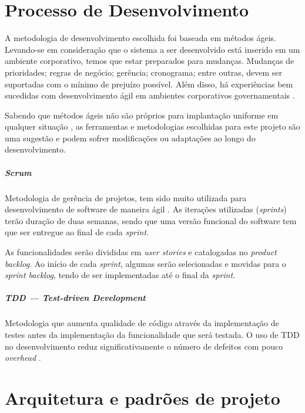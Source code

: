 \documentclass[12pt,a4paper]{report}
\begin{document}
\chapter{Processo de Desenvolvimento}

A metodologia de desenvolvimento escolhida foi baseada em métodos ágeis. Levando-se em consideração que o sistema a ser desenvolvido está inserido em um ambiente corporativo, temos que estar preparados para mudanças. Mudanças de prioridades; regras de negócio; gerência; cronograma; entre outras, devem ser suportadas com o mínimo de prejuízo possível. Além disso, há experiências bem sucedidas com desenvolvimento ágil em ambientes corporativos governamentais \cite{metaginstpub}.

Sabendo que métodos ágeis não são próprios para implantação uniforme em qualquer situação \cite{cohn2009succeeding}, as ferramentas e metodologias escolhidas para este projeto são uma sugestão e podem sofrer modificações ou adaptações ao longo do desenvolvimento.

\paragraph{Scrum} Metodologia de gerência de projetos, tem sido muito utilizada para desenvolvimento de software de maneira ágil \cite{854065}. As iterações utilizadas (\textit{sprints}) terão duração de duas semanas, sendo que uma versão funcional do software tem que ser entregue ao final de cada \textit{sprint}.

As funcionalidades serão divididas em \textit{user stories} e catalogadas no \textit{product backlog}. Ao início de cada \textit{sprint}, algumas serão selecionadas e movidas para o \textit{sprint backlog}, tendo de ser implementadas até o final da \textit{sprint}.

\paragraph{TDD --- \textit{Test-driven Development}} Metodologia que aumenta qualidade de código através da implementação de testes antes da implementação da funcionalidade que será testada. O uso de TDD no desenvolvimento reduz significativamente o número de defeitos com pouco \textit{overhead} \cite{1201238}.

\chapter{Arquitetura e padrões de projeto}
\end{document}
